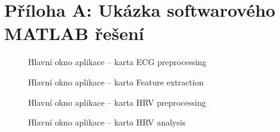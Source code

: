 \section*{Příloha A: Ukázka softwarového MATLAB řešení}
\label{att:sw_matlab}

\begin{figure}[H]
    \begin{center}
        \textcolor{cyan}{\fboxrule=0.3pt\fboxsep=0pt}
        \caption{Hlavní okno aplikace -- karta ECG preprocessing}
        \label{fig:results_matlab_tab1}
    \end{center}
\end{figure}

\begin{figure}[H]
    \begin{center}
        \textcolor{cyan}{\fboxrule=0.3pt\fboxsep=0pt}
        \caption{Hlavní okno aplikace -- karta Feature extraction}
        \label{fig:results_matlab_tab2}
    \end{center}
\end{figure}

\begin{figure}[H]
    \begin{center}
        \textcolor{cyan}{\fboxrule=0.3pt\fboxsep=0pt}
        \caption{Hlavní okno aplikace -- karta HRV preprocessing}
        \label{fig:results_matlab_tab3}
    \end{center}
\end{figure}

\begin{figure}[H]
    \begin{center}
        \textcolor{cyan}{\fboxrule=0.3pt\fboxsep=0pt}
        \caption{Hlavní okno aplikace -- karta HRV analysis}
        \label{fig:results_matlab_tab4_}
    \end{center}
\end{figure}

\clearpage


